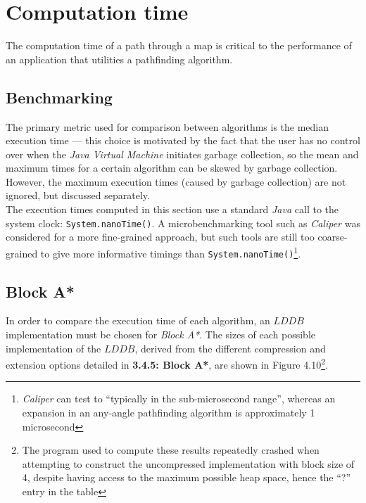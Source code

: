 \documentclass[12pt,notitlepage]{report}
\begin{document}
\section{Computation time}
The computation time of a path through a map is critical to the performance of an application that utilities a pathfinding algorithm.

\subsection{Benchmarking}
The primary metric used for comparison between algorithms is the median execution time --- this choice is motivated by the fact that the user has no control over when the {\em Java Virtual Machine} initiates garbage collection, so the mean and maximum times for a certain algorithm can be skewed by garbage collection. However, the maximum execution times (caused by garbage collection) are not ignored, but discussed separately.\\

\noindent
The execution times computed in this section use a standard {\em Java} call to the system clock: {\tt System.nanoTime()}. A microbenchmarking tool such as {\em Caliper} was considered for a more fine-grained approach, but such tools are still too coarse-grained to give more informative timings than {\tt System.nanoTime()}\footnote{{\em Caliper} can test to ``typically in the sub-microsecond range'', whereas an expansion in an any-angle pathfinding algorithm is approximately 1 microsecond}.

\subsection{Block A*}
In order to compare the execution time of each algorithm, an $LDDB$ implementation must be chosen for {\em Block A*}. The sizes of each possible implementation of the $LDDB$, derived from the different compression and extension options detailed in {\bfseries 3.4.5: Block A*}, are shown in Figure 4.10\footnote{The program used to compute these results repeatedly crashed when attempting to construct the uncompressed implementation with block size of 4, despite having access to the maximum possible heap space, hence the ``?'' entry in the table}.\\
\end{document}
